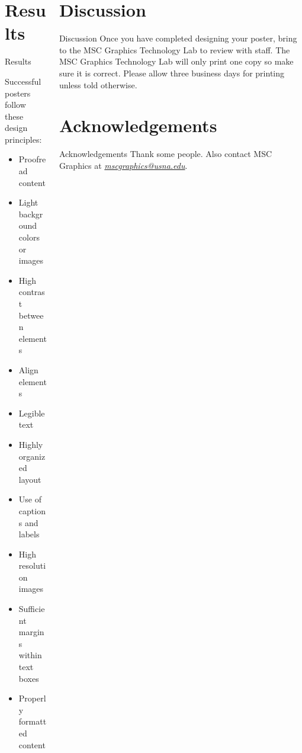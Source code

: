 \documentclass[pdf]{beamer}
\begin{document}
\begin{frame}{}
\begin{columns}[T]
\begin{column}{0.25\textwidth}
\section{Results}
\begin{block}{Results}
\begin{center}
\begin{minipage}{0.8\linewidth}
\begin{exampleblock}{}
Successful posters follow these design principles:
\begin{itemize}
\item Proofread content
\item Light background colors or images
\item High contrast between elements
\item Align elements
\item Legible text
\item Highly organized layout
\item Use of captions and labels
\item High resolution images
\item Sufficient margins within text boxes
\item Properly formatted content
\end{itemize}
\end{exampleblock}
\end{minipage}
\end{center}
\end{block}
\end{column}


\begin{column}{0.25\textwidth}
\section{Discussion}
\begin{block}{Discussion}
Once you have completed designing your poster, bring to the MSC Graphics Technology Lab to review with staff. The MSC Graphics Technology Lab will only print one copy so make sure it is correct. Please allow three business days for printing unless told otherwise.
\end{block}

\section*{Acknowledgements}
\begin{block}{Acknowledgements}
Thank some people. Also contact MSC Graphics at \href{mailto://mscgraphics@usna.edu}{\emph{mscgraphics@usna.edu}}.
\end{block}


\end{column}
\end{columns}
\end{frame}
\end{document}
